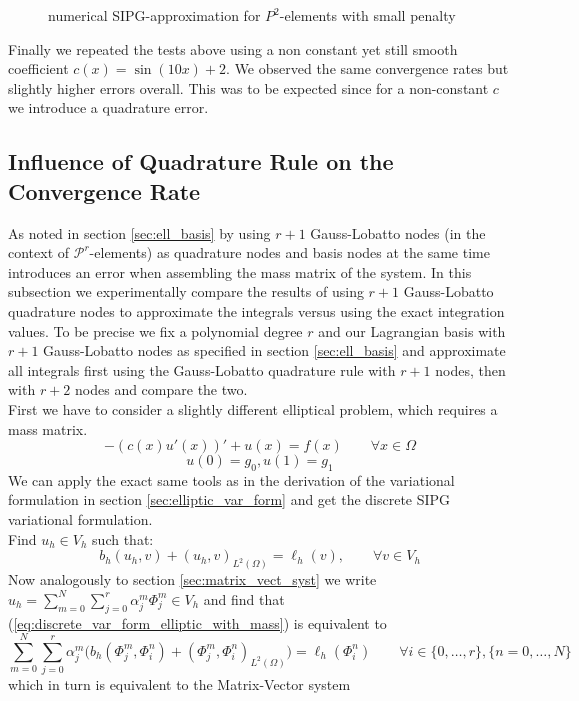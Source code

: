 \begin{figure}[h!]
\begin{minipage}[t]{0.48\textwidth}
        \caption{numerical SIPG-approximation for $P^2$-elements with small penalty}
        \label{fig:elliptic_uniform_mesh_sol_p2_non_coercive}
    \end{minipage}
\end{figure}

Finally we repeated the tests above using a non constant yet still smooth coefficient $c(x) = \sin(10x) + 2$. We observed the same convergence rates but slightly higher
errors overall. This was to be expected since for a non-constant $c$ we introduce a quadrature error. 

\subsection{Influence of Quadrature Rule on the Convergence Rate}
As noted in section \ref{sec:ell_basis} by using $r+1$ Gauss-Lobatto nodes (in the context of $\mathcal{P}^r$-elements) as quadrature nodes and basis nodes at the same time
introduces an error when assembling the mass matrix of the system. In this subsection we experimentally compare the results of using $r+1$ Gauss-Lobatto quadrature nodes
to approximate the integrals versus using the exact integration values. To be precise we fix a polynomial degree $r$ and our Lagrangian basis with $r+1$ Gauss-Lobatto nodes
as specified in section \ref{sec:ell_basis} and approximate all integrals first using the Gauss-Lobatto quadrature rule with $r+1$ nodes, then with $r+2$ nodes and compare the two.
\\
First we have to consider a slightly different elliptical problem, which requires a mass matrix. 
\begin{equation}
	\label{eq:elliptic_pde}
	-(c(x)u'(x))' + u(x) = f(x) \qquad \forall x\in \Omega \nonumber
\end{equation}
\begin{equation}
	\label{eq:elliptic_pde_bc}
	u(0) = g_0, u(1) = g_1 \nonumber
\end{equation}
We can apply the exact same tools as in the derivation of the variational formulation in section \ref{sec:elliptic_var_form} and get the discrete SIPG variational formulation. \\
Find $u_h \in V_h$ such that:
\begin{equation}
	\label{eq:discrete_var_form_elliptic_with_mass}
	b_h(u_h, v) + (u_h, v)_{L^2(\Omega)} = \ell_h(v), \qquad \forall v\in V_h 
\end{equation}
Now analogously to section \ref{sec:matrix_vect_syst} we write $u_h = \sum_{m=0}^{N} \sum_{j=0}^r \alpha_j^m \Phi_j^m \in V_h$ and find that (\ref{eq:discrete_var_form_elliptic_with_mass})
is equivalent to \\
\begin{equation*}
	\sum_{m=0}^{N} \sum_{j=0}^r \alpha_j^m \Big(b_h(\Phi_j^m, \Phi_i^n) + (\Phi_j^m, \Phi_i^n)_{L^2(\Omega)}\Big) = \ell_h(\Phi_i^n) \qquad \forall i \in \{0,\ldots,r\}, \{n = 0,\ldots,N\}
\end{equation*}
which in turn is equivalent to the Matrix-Vector system

